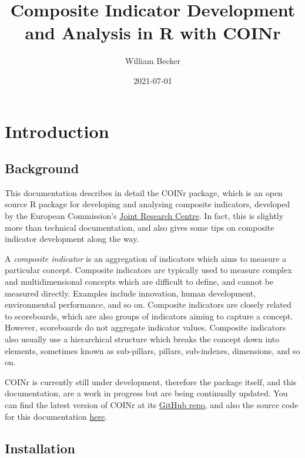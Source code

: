 \documentclass[
]{book}
\title{Composite Indicator Development and Analysis in R with COINr}
\author{William Becker}
\date{2021-07-01}
\begin{document}
\maketitle

{
\setcounter{tocdepth}{1}
\tableofcontents
}
\hypertarget{introduction}{%
\chapter{Introduction}\label{introduction}}

\hypertarget{background}{%
\section{Background}\label{background}}

This documentation describes in detail the COINr package, which is an open source R package for developing and analysing composite indicators, developed by the European Commission's \href{https://knowledge4policy.ec.europa.eu/composite-indicators/about_en}{Joint Research Centre}. In fact, this is slightly more than technical documentation, and also gives some tips on composite indicator development along the way.

A \emph{composite indicator} is an aggregation of indicators which aims to measure a particular concept. Composite indicators are typically used to measure complex and multidimensional concepts which are difficult to define, and cannot be measured directly. Examples include innovation, human development, environmental performance, and so on. Composite indicators are closely related to scoreboards, which are also groups of indicators aiming to capture a concept. However, scoreboards do not aggregate indicator values. Composite indicators also usually use a hierarchical structure which breaks the concept down into elements, sometimes known as sub-pillars, pillars, sub-indexes, dimensions, and so on.

COINr is currently still under development, therefore the package itself, and this documentation, are a work in progress but are being continually updated. You can find the latest version of COINr at its \href{https://github.com/bluefoxr/COINr}{GitHub repo}, and also the source code for this documentation \href{https://github.com/bluefoxr/COINrDoc}{here}.

\hypertarget{installation}{%
\section{Installation}\label{installation}}
\end{document}

